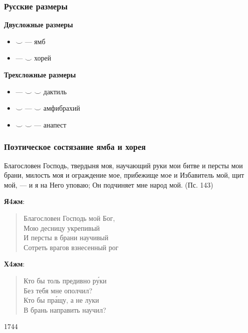 \documentclass{beamer}
\begin{document}
\begin{frame}
\frametitle{Русские размеры}
\begin{center}
\textbf{Двусложные размеры}
\end{center}

\begin{itemize}
\item  $\smile$ --- ямб
\item  --- $\smile$ хорей
\end{itemize}

\begin{center}
\textbf{Трехсложные размеры}
\end{center}

\begin{itemize}
\item  --- $\smile$ $\smile$ дактиль
\item  $\smile$ --- $\smile$ амфибрахий
\item  $\smile$ $\smile$ --- анапест
\end{itemize}

\end{frame}




\begin{frame}
\frametitle{Поэтическое состязание ямба и хорея}

Благословен Господь, твердыня моя, научающий руки мои битве и персты мои брани, милость моя и ограждение мое, прибежище мое и Избавитель мой, щит мой, — и я на Него уповаю; Он подчиняет мне народ мой. (Пс. 143)

\textbf{Я4жм}:
\begin{verse}
Благословен Господь мой Бог,\\
Мою десницу укрепивый\\
И персты в брани научивый\\
Сотреть врагов взнесенный рог
\end{verse}

\textbf{Х4жм}:
\begin{verse}
Кто бы толь предивно р\'{у}ки\\
Без тебя мне ополчил?\\
Кто бы пр\'{а}щу, а не луки\\
В брань направить научил?
\end{verse}
1744
\end{frame}
\end{document}
